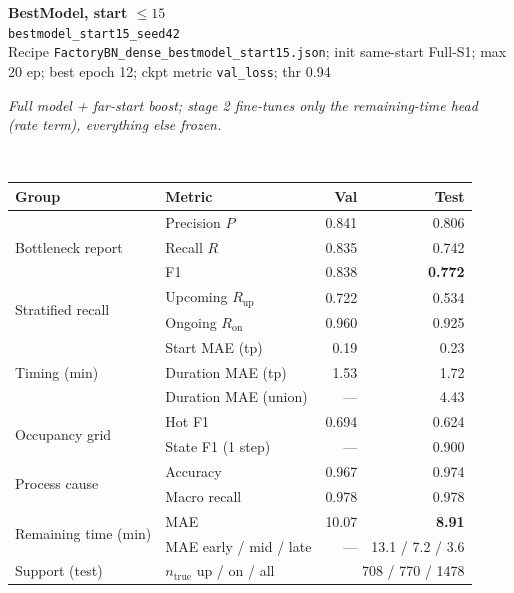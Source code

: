 \documentclass[9pt,a4paper,twocolumn]{extarticle}
\begin{document}
\noindent\begin{minipage}{\columnwidth}
\begin{center}
{\small\bfseries BestModel, start $\le 15$}\\
{\scriptsize\texttt{bestmodel\_start15\_seed42}}\\
{\scriptsize Recipe \texttt{FactoryBN\_dense\_bestmodel\_start15.json}; init same-start Full-S1; max 20 ep; best epoch 12; ckpt metric \texttt{val\_loss}; thr 0.94}\\[1pt]
\parbox{0.96\columnwidth}{\scriptsize\itshape Full model + far-start boost; stage 2 fine-tunes only the remaining-time head (rate term), everything else frozen.}\\[2pt]
\scriptsize\setlength{\tabcolsep}{3pt}
\begin{tabular}{llrr}
\toprule
Group & Metric & Val & Test \\
\midrule
\multirow{3}{*}{Bottleneck report}
  & Precision $P$ & 0.841 & 0.806 \\
  & Recall $R$ & 0.835 & 0.742 \\
  & F1 & 0.838 & \textbf{0.772} \\
\midrule
\multirow{2}{*}{Stratified recall}
  & Upcoming $R_{\mathrm{up}}$ & 0.722 & 0.534 \\
  & Ongoing $R_{\mathrm{on}}$ & 0.960 & 0.925 \\
\midrule
\multirow{3}{*}{Timing (min)}
  & Start MAE (tp) & 0.19 & 0.23 \\
  & Duration MAE (tp) & 1.53 & 1.72 \\
  & Duration MAE (union) & --- & 4.43 \\
\midrule
\multirow{2}{*}{Occupancy grid}
  & Hot F1 & 0.694 & 0.624 \\
  & State F1 (1 step) & --- & 0.900 \\
\midrule
\multirow{2}{*}{Process cause}
  & Accuracy & 0.967 & 0.974 \\
  & Macro recall & 0.978 & 0.978 \\
\midrule
\multirow{2}{*}{Remaining time (min)}
  & MAE & 10.07 & \textbf{8.91} \\
  & MAE early / mid / late & --- & 13.1 / 7.2 / 3.6 \\
\midrule
Support (test)
  & $n_{\mathrm{true}}$ up / on / all & \multicolumn{2}{r}{708 / 770 / 1478} \\
\bottomrule
\end{tabular}
\end{center}
\end{minipage}\par\vspace{6pt}
\end{document}
